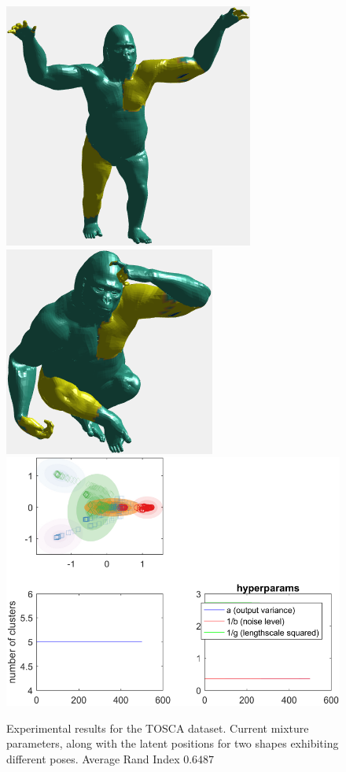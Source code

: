 \documentclass[]{article}
\begin{document}
\begin{figure}[ht!]
	\centering
	
		\includegraphics[width=0.43\linewidth]{img/gorillaAMVMMexp1}
			\includegraphics[width=0.4\linewidth]{img/gorillaAMVMMexp2}\\
	\includegraphics[width=0.45\linewidth]{img/GorillasMVWMM100Nexp2}
	\caption{Experimental results for the TOSCA dataset. Current mixture parameters, along with the latent positions for two shapes exhibiting different poses. Average Rand Index $0.6487$ }
\end{figure}
\end{document}
